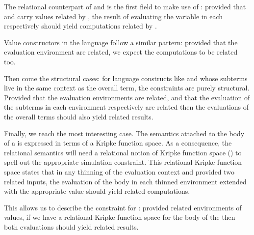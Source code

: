 
The relational counterpart of  and  is the first field to make use
of : provided that  and  carry values related by , the result
of evaluating the variable  in each respectively should yield computations related
by .


Value constructors in the language follow a similar pattern: provided that the evaluation
environment are related, we expect the computations to be related too.


Then come the structural cases: for language constructs like  and 
whose subterms live in the same context as the overall term, the constraints are purely
structural. Provided that the evaluation environments are related, and that the evaluation
of the subterms in each environment respectively are related then the evaluations of the
overall terms should also yield related results.


Finally, we reach the most interesting case. The semantics attached to the body of a
 is expressed in terms of a Kripke function space. As a consequence, the
relational semantics will need a relational notion of Kripke function space ()
to spell out the appropriate simulation constraint. This relational Kripke function space
states that in any thinning of the evaluation context and provided two related inputs,
the evaluation of the body in each thinned environment extended with the appropriate
value should yield related computations.


This allows us to describe the constraint for : provided related environments
of values, if we have a relational Kripke function space for the body of the 
then both evaluations should yield related results.


